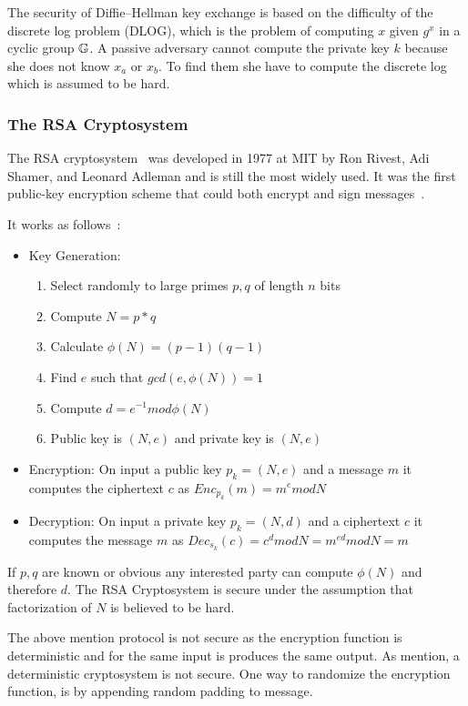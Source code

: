 The security of Diffie–Hellman key exchange is based on the difficulty of the discrete log problem (DLOG), which is the problem of computing $x$ given $g^{x}$ in a cyclic group $\mathbb{G}$. A passive adversary cannot compute the private key $k$ because she does not know $x_a$ or $x_b$. To find them she have to compute the discrete log which is assumed to be hard.

\subsubsection{The RSA Cryptosystem}
\label{preliminaries:crypto_block:pub:rsa}

The RSA cryptosystem~\cite{rsa} was developed in 1977 at MIT by Ron Rivest, Adi Shamer, and Leonard Adleman and is still the most widely used. It was the first public-key encryption scheme that could both encrypt and sign messages~\cite{kiagias:crypto}.

It works as follows~\cite{Katz:2014:IMC:2700550, kiagias:crypto}:

\begin{itemize}
  \item Key Generation:
    \begin{enumerate}
      \item Select randomly to large primes $p, q$ of length $n$ bits
      \item Compute $N = p*q$
      \item Calculate $\phi(N) = (p - 1)(q - 1)$
      \item Find $e$ such that $gcd(e, \phi(N)) = 1$
      \item Compute $d = e^{-1} mod\phi(N)$
      \item Public key is $(N, e)$ and private key is $(N, e)$
    \end{enumerate}
  \item Encryption: On input a public key $p_k = (N, e)$ and a message $m$ it computes the ciphertext $c$ as $ Enc_{p_k}(m) = m^{e}modN$
  \item Decryption: On input a private key $p_k = (N, d)$ and a ciphertext $c$ it computes the message $m$ as $ Dec_{s_k}(c) = c^{d}modN = m^{ed}modN = m$
\end{itemize}

If $p, q$ are known or obvious any interested party can compute $\phi(N)$ and therefore $d$. The RSA Cryptosystem is secure under the assumption that factorization of $N$ is believed to be hard.

The above mention protocol is not secure as the encryption function is deterministic and for the same input is produces the same output. As mention, a deterministic cryptosystem is not secure. One way to randomize the encryption function, is by appending random padding to message.

